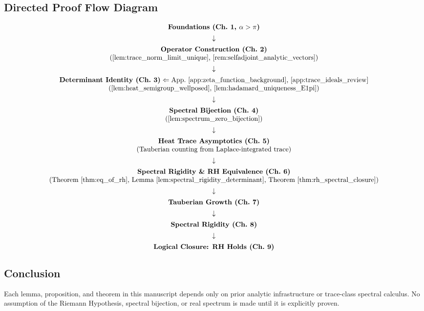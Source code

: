 \subsection*{Directed Proof Flow Diagram}
\label{fig:dag_appendix_b}

\[
\begin{array}{c}
\textbf{Foundations (Ch.~1, $\alpha > \pi$)} \\[1ex]
\downarrow \\[1ex]
\textbf{Operator Construction (Ch.~2)} \\
\text{(\cref{lem:trace_norm_limit_unique}, \cref{rem:selfadjoint_analytic_vectors})} \\[1ex]
\downarrow \\[1ex]
\textbf{Determinant Identity (Ch.~3)} \Leftarrow \text{App.~\ref{app:zeta_function_background}, \ref{app:trace_ideals_review}} \\
\text{(\cref{lem:heat_semigroup_wellposed}, \cref{lem:hadamard_uniqueness_E1pi})} \\[1ex]
\downarrow \\[1ex]
\textbf{Spectral Bijection (Ch.~4)} \\
\text{(\cref{lem:spectrum_zero_bijection})} \\[1ex]
\downarrow \\[1ex]
\textbf{Heat Trace Asymptotics (Ch.~5)} \\
\text{(Tauberian counting from Laplace-integrated trace)} \\[1ex]
\downarrow \\[1ex]
\textbf{Spectral Rigidity \& RH Equivalence (Ch.~6)} \\
\text{(\thmref{thm:eq_of_rh}, \lemref{lem:spectral_rigidity_determinant}, \thmref{thm:rh_spectral_closure})} \\[1ex]
\downarrow \\[1ex]
\textbf{Tauberian Growth (Ch.~7)} \\[1ex]
\downarrow \\[1ex]
\textbf{Spectral Rigidity (Ch.~8)} \\[1ex]
\downarrow \\[1ex]
\textbf{Logical Closure: RH Holds (Ch.~9)}
\end{array}
\]

\subsection*{Conclusion}

Each lemma, proposition, and theorem in this manuscript depends only on prior analytic infrastructure or trace-class spectral calculus. No assumption of the Riemann Hypothesis, spectral bijection, or real spectrum is made until it is explicitly proven.

